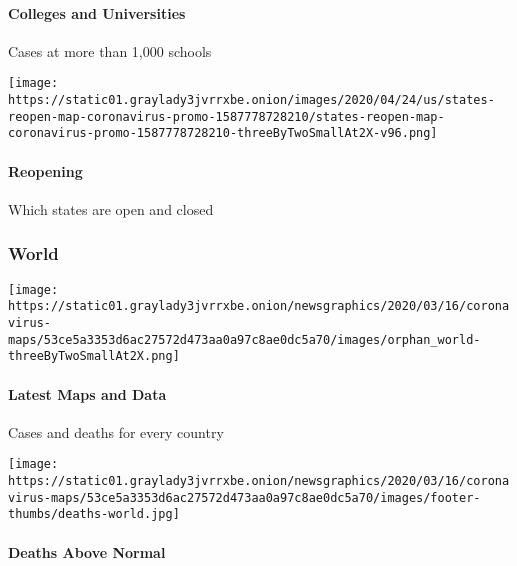 \hypertarget{colleges-and-universities}{%
\paragraph{Colleges and Universities}\label{colleges-and-universities}}

Cases at more than 1,000 schools

\href{https://www.nytimes3xbfgragh.onion/interactive/2020/us/states-reopen-map-coronavirus.html}{}

\texttt{[image: https://static01.graylady3jvrrxbe.onion/images/2020/04/24/us/states-reopen-map-coronavirus-promo-1587778728210/states-reopen-map-coronavirus-promo-1587778728210-threeByTwoSmallAt2X-v96.png]}

\hypertarget{reopening}{%
\paragraph{Reopening}\label{reopening}}

Which states are open and closed

\hypertarget{world}{%
\subsubsection{World}\label{world}}

\href{https://www.nytimes3xbfgragh.onion/interactive/2020/world/coronavirus-maps.html}{}

\texttt{[image: https://static01.graylady3jvrrxbe.onion/newsgraphics/2020/03/16/coronavirus-maps/53ce5a3353d6ac27572d473aa0a97c8ae0dc5a70/images/orphan\_world-threeByTwoSmallAt2X.png]}

\hypertarget{latest-maps-and-data-1}{%
\paragraph{Latest Maps and Data}\label{latest-maps-and-data-1}}

Cases and deaths for every country

\href{https://www.nytimes3xbfgragh.onion/interactive/2020/04/21/world/coronavirus-missing-deaths.html}{}

\texttt{[image: https://static01.graylady3jvrrxbe.onion/newsgraphics/2020/03/16/coronavirus-maps/53ce5a3353d6ac27572d473aa0a97c8ae0dc5a70/images/footer-thumbs/deaths-world.jpg]}

\hypertarget{deaths-above-normal-1}{%
\paragraph{Deaths Above Normal}\label{deaths-above-normal-1}}

